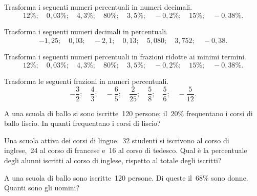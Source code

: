\subsubsection*{}

\begin{esercizio}
 \label{ese:3.79}
Trasforma i seguenti numeri percentuali in numeri decimali.
\[12\%;\quad0,03\%;\quad4,3\%;\quad80\%;\quad3,5\%;\quad-0,2\%;\quad15\%;
\quad-0,38\%.\]
\end{esercizio}

\begin{esercizio}
 \label{ese:3.80}
Trasforma i seguenti numeri decimali in percentuali.
\[-1,25;\quad0,03;\quad-2,\overline{1};\quad0,\overline{13};\quad5,080;
\quad3,7\overline{52};\quad-0,38.\]
\end{esercizio}

\begin{esercizio}
 \label{ese:3.81}
Trasforma i seguenti numeri percentuali in frazioni ridotte ai minimi termini.
\[12\%;\quad0,03\%;\quad4,3\%;\quad80\%;\quad3,5\%;\quad-0,2\%;\quad15\%;
\quad-0,38\%.\]
\end{esercizio}

\begin{esercizio}
\label{ese:3.82}
Trasforma le seguenti frazioni in numeri percentuali.
\[-\frac{3}{2};\quad\frac{4}{3};\quad-\frac{6}{5};\quad\frac{2}{25};
\quad\frac{5}{8};\quad\frac{5}{6};\quad-\frac{5}{12}.\]
\end{esercizio}

\begin{esercizio}
 \label{ese:3.83}
A una scuola di ballo si sono iscritte~120 persone; il~\(20\%\) frequentano i 
corsi di ballo liscio. In quanti frequentano i corsi di liscio?
\end{esercizio}

\begin{esercizio}
 \label{ese:3.84}
Una scuola attiva dei corsi di lingue.~32 studenti si iscrivono al corso di 
inglese,~24 al corso di francese e~16 al corso di tedesco.
Qual è la percentuale degli alunni iscritti al corso di inglese, rispetto al 
totale degli iscritti?
\end{esercizio}

\begin{esercizio}
 \label{ese:3.85}
A una scuola di ballo sono iscritte~120 persone. Di queste il~\(68\%\) sono 
donne. Quanti sono gli uomini?
\end{esercizio}

